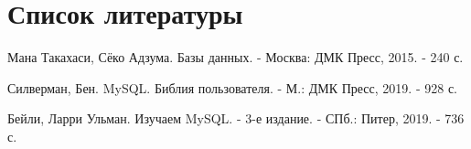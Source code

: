 \documentclass[11pt,a4paper,final]{article} %
\begin{document}
\newpage
\section*{Список литературы}

\begin{enumerate}[label={[\arabic*]}]
\item Мана Такахаси, Сёко Адзума. Базы данных. - Москва: ДМК Пресс, 2015. - 240 с.

\item Силверман, Бен. MySQL. Библия пользователя. - М.: ДМК Пресс, 2019. - 928 с.

\item Бейли, Ларри Ульман. Изучаем MySQL. - 3-е издание. - СПб.: Питер, 2019. - 736 с.

\end{enumerate}
\end{document}
